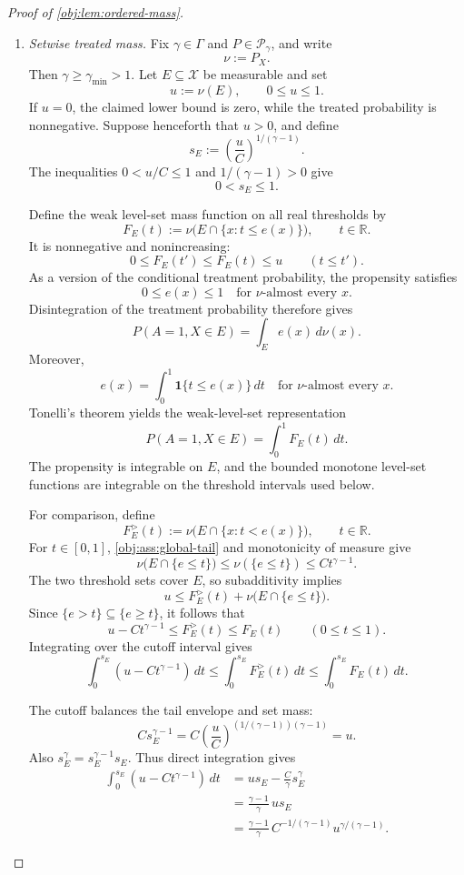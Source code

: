\begin{proof}[Proof of \cref{obj:lem:ordered-mass}]
\begin{enumerate}
\item \emph{Setwise treated mass.}
Fix \(\gamma\in\Gamma\) and \(P\in\mathcal P_\gamma\), and write
\[
\nu:=P_X.
\]
Then \(\gamma\ge\gamma_{\min}>1\). Let \(E\subseteq\mathcal X\) be measurable and set
\[
u:=\nu(E),
\qquad 0\le u\le1.
\]
If \(u=0\), the claimed lower bound is zero, while the treated probability is nonnegative. Suppose henceforth that \(u>0\), and define
\[
s_E:=\left(\frac uC\right)^{1/(\gamma-1)}.
\]
The inequalities \(0<u/C\le1\) and \(1/(\gamma-1)>0\) give
\[
0<s_E\le1.
\]

Define the weak level-set mass function on all real thresholds by
\[
F_E(t):=\nu\bigl(E\cap\{x:t\le e(x)\}\bigr),
\qquad t\in\mathbb R.
\]
It is nonnegative and nonincreasing:
\[
0\le F_E(t')\le F_E(t)\le u
\qquad(t\le t').
\]
As a version of the conditional treatment probability, the propensity satisfies
\[
0\le e(x)\le1
\quad\text{for }\nu\text{-almost every }x.
\]
Disintegration of the treatment probability therefore gives
\[
P(A=1,X\in E)=\int_E e(x)\,d\nu(x).
\]
Moreover,
\[
e(x)=\int_0^1\mathbf 1\{t\le e(x)\}\,dt
\quad\text{for }\nu\text{-almost every }x.
\]
Tonelli's theorem yields the weak-level-set representation
\[
P(A=1,X\in E)=\int_0^1F_E(t)\,dt.
\]
The propensity is integrable on \(E\), and the bounded monotone level-set functions are integrable on the threshold intervals used below.

For comparison, define
\[
F_E^{>}(t):=\nu\bigl(E\cap\{x:t<e(x)\}\bigr),
\qquad t\in\mathbb R.
\]
For \(t\in[0,1]\), \cref{obj:ass:global-tail} and monotonicity of measure give
\[
\nu\bigl(E\cap\{e\le t\}\bigr)
\le \nu(\{e\le t\})
\le Ct^{\gamma-1}.
\]
The two threshold sets cover \(E\), so subadditivity implies
\[
u\le F_E^{>}(t)+\nu\bigl(E\cap\{e\le t\}\bigr).
\]
Since \(\{e>t\}\subseteq\{e\ge t\}\), it follows that
\[
u-Ct^{\gamma-1}\le F_E^{>}(t)\le F_E(t)
\qquad(0\le t\le1).
\]
Integrating over the cutoff interval gives
\[
\int_0^{s_E}(u-Ct^{\gamma-1})\,dt
\le
\int_0^{s_E}F_E^{>}(t)\,dt
\le
\int_0^{s_E}F_E(t)\,dt.
\]

The cutoff balances the tail envelope and set mass:
\[
Cs_E^{\gamma-1}
=
C\left(\frac uC\right)^{(1/(\gamma-1))(\gamma-1)}
=u.
\]
Also \(s_E^\gamma=s_E^{\gamma-1}s_E\). Thus direct integration gives
\[
\begin{aligned}
\int_0^{s_E}(u-Ct^{\gamma-1})\,dt
&=us_E-\frac C\gamma s_E^\gamma\\
&=\frac{\gamma-1}{\gamma}\,us_E\\
&=\frac{\gamma-1}{\gamma}\,
C^{-1/(\gamma-1)}u^{\gamma/(\gamma-1)}.
\end{aligned}
\]


\end{enumerate}
\end{proof}
